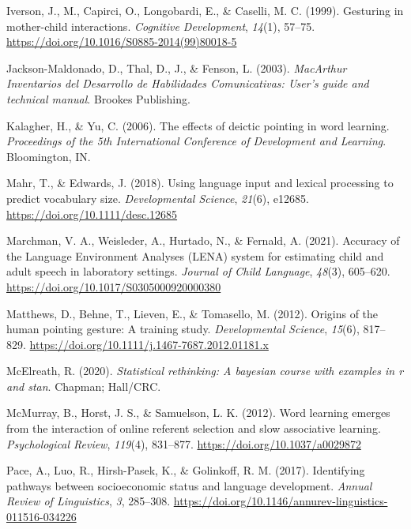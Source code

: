 \documentclass[
  man,mask,floatsintext]{apa6}
\newlength{\cslhangindent}
\newlength{\cslentryspacingunit} %
\newenvironment{CSLReferences}[2] %
 {%
  \setlength{\parindent}{0pt}
  \ifodd #1
  \let\oldpar\par
  \def\par{\hangindent=\cslhangindent\oldpar}
  \fi
  \setlength{\parskip}{#2\cslentryspacingunit}
 }%
 {}
\begin{document}
\begin{CSLReferences}{1}{0}
\leavevmode{}%
Iverson, J., M., Capirci, O., Longobardi, E., \& Caselli, M. C. (1999). Gesturing in mother-child interactions. \emph{Cognitive Development}, \emph{14}(1), 57--75. \url{https://doi.org/10.1016/S0885-2014(99)80018-5}

\leavevmode{}%
Jackson-Maldonado, D., Thal, D., J., \& Fenson, L. (2003). \emph{{MacArthur} {Inventarios} del {Desarrollo} de {Habilidades} {Comunicativas}: {User}'s guide and technical manual}. Brookes Publishing.

\leavevmode{}%
Kalagher, H., \& Yu, C. (2006). The effects of deictic pointing in word learning. \emph{Proceedings of the 5th {International} {Conference} of {Development} and {Learning}}. Bloomington, IN.

\leavevmode{}%
Mahr, T., \& Edwards, J. (2018). Using language input and lexical processing to predict vocabulary size. \emph{Developmental Science}, \emph{21}(6), e12685. \url{https://doi.org/10.1111/desc.12685}

\leavevmode{}%
Marchman, V. A., Weisleder, A., Hurtado, N., \& Fernald, A. (2021). Accuracy of the {Language} {Environment} {Analyses} ({LENA}) system for estimating child and adult speech in laboratory settings. \emph{Journal of Child Language}, \emph{48}(3), 605--620. \url{https://doi.org/10.1017/S0305000920000380}

\leavevmode{}%
Matthews, D., Behne, T., Lieven, E., \& Tomasello, M. (2012). Origins of the human pointing gesture: A training study. \emph{Developmental Science}, \emph{15}(6), 817--829. \url{https://doi.org/10.1111/j.1467-7687.2012.01181.x}

\leavevmode{}%
McElreath, R. (2020). \emph{Statistical rethinking: {A} bayesian course with examples in r and stan}. Chapman; Hall/CRC.

\leavevmode{}%
McMurray, B., Horst, J. S., \& Samuelson, L. K. (2012). Word learning emerges from the interaction of online referent selection and slow associative learning. \emph{Psychological Review}, \emph{119}(4), 831--877. \url{https://doi.org/10.1037/a0029872}

\leavevmode{}%
Pace, A., Luo, R., Hirsh-Pasek, K., \& Golinkoff, R. M. (2017). Identifying pathways between socioeconomic status and language development. \emph{Annual Review of Linguistics}, \emph{3}, 285--308. \url{https://doi.org/10.1146/annurev-linguistics-011516-034226}


\end{CSLReferences}
\end{document}
